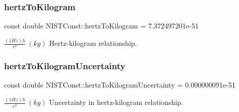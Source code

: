 \subsubsection{\texorpdfstring{hertz\+To\+Kilogram}{hertzToKilogram}}
{\footnotesize\ttfamily const double N\+I\+S\+T\+Const\+::hertz\+To\+Kilogram = 7.\+372497201e-\/51}

$\frac{(1 Hz)h}{c^2} \ (kg)$ Hertz-\/kilogram relationship. \mbox{\label{group___n_i_s_t_const-_hertz_gab0659e6441271775cddea1c3bef17708}} 
\subsubsection{\texorpdfstring{hertz\+To\+Kilogram\+Uncertainty}{hertzToKilogramUncertainty}}
{\footnotesize\ttfamily const double N\+I\+S\+T\+Const\+::hertz\+To\+Kilogram\+Uncertainty = 0.\+000000091e-\/51}

$\frac{(1 Hz)h}{c^2} \ (kg)$ Uncertainty in hertz-\/kilogram relationship. 
